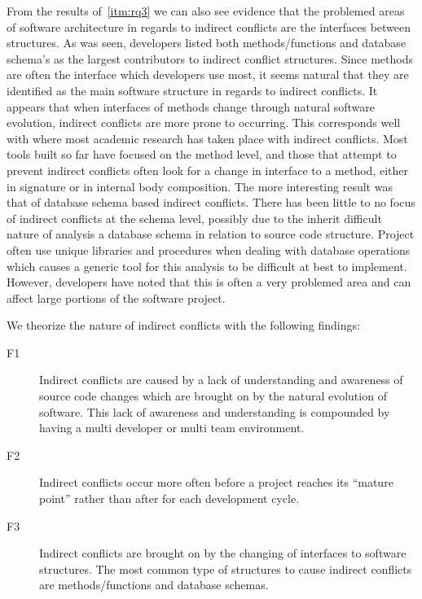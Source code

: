 \documentclass[conference]{IEEEtran}
\makeatletter
\def\namedlabel#1#2{\begingroup
   \def\@currentlabel{#2}%
   \label{#1}\endgroup
}
\makeatother
\begin{document}
From the results of~\ref{itm:rq3} we can also see evidence that the problemed areas of software architecture in regards to indirect conflicts are
the interfaces between structures. As was seen, developers listed both methods/functions and database schema's as the largest contributors
to indirect conflict structures. Since methods are often the interface which developers use most, it seems natural that they are identified
as the main software structure in regards to indirect conflicts. It appears that when interfaces of methods change through natural software
evolution, indirect conflicts are more prone to occurring. This corresponds well with where most academic research has taken place with indirect
conflicts. Most tools built so far have focused on the method level, and those that attempt to prevent indirect conflicts often look for a change
in interface to a method, either in signature or in internal body composition. The more interesting result was that of database schema based 
indirect conflicts. There has been little to no focus of indirect conflicts at the schema level, possibly due to the inherit difficult nature
of analysis a database schema in relation to source code structure. Project often use unique libraries and procedures when dealing with
database operations which causes a generic tool for this analysis to be difficult at best to implement. However, developers have noted that this
is often a very problemed area and can affect large portions of the software project. 

We theorize the nature of indirect conflicts with the following findings: 
\begin{description}
	\item[F1\namedlabel{itm:f1}{F1}] Indirect conflicts are caused by a lack of understanding and awareness of source code changes which are brought on
						by the natural evolution of software. This lack of awareness and understanding is compounded by having a multi developer
						or multi team environment.
	\item[F2\namedlabel{itm:f2}{F2}] Indirect conflicts occur more often before a project reaches its ``mature point'' rather than after for each development
						cycle.
	\item[F3\namedlabel{itm:f3}{F3}] Indirect conflicts are brought on by the changing of interfaces to software structures. The most common type of structures
						to cause indirect conflicts are methods/functions and database schemas.
\end{description}
\end{document}
